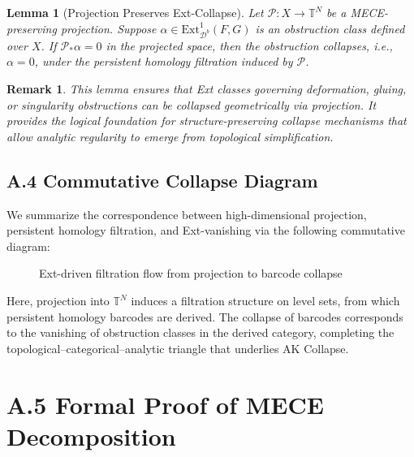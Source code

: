 \documentclass[11pt]{article}
\newtheorem{remark}[theorem]{Remark}
\newtheorem{lemma}[theorem]{Lemma}
\begin{document}
\begin{lemma}[Projection Preserves Ext-Collapse]
Let $\mathcal{P} : X \to \mathbb{T}^N$ be a MECE-preserving projection.  
Suppose $\alpha \in \mathrm{Ext}^1_{\mathcal{D}^b}(F, G)$ is an obstruction class defined over $X$.  
If $\mathcal{P}_\ast \alpha = 0$ in the projected space, then the obstruction collapses, i.e., $\alpha = 0$, under the persistent homology filtration induced by $\mathcal{P}$.
\end{lemma}

\begin{remark}
This lemma ensures that Ext classes governing deformation, gluing, or singularity obstructions can be collapsed geometrically via projection.  
It provides the logical foundation for structure-preserving collapse mechanisms that allow analytic regularity to emerge from topological simplification.
\end{remark}



\subsection*{A.4 Commutative Collapse Diagram}

We summarize the correspondence between high-dimensional projection, persistent homology filtration, and Ext-vanishing via the following commutative diagram:

\begin{figure}[htbp]
\centering
{}
\caption{Ext-driven filtration flow from projection to barcode collapse}
\end{figure}


Here, projection into $\mathbb{T}^N$ induces a filtration structure on level sets, from which persistent homology barcodes are derived.  
The collapse of barcodes corresponds to the vanishing of obstruction classes in the derived category, completing the topological–categorical–analytic triangle that underlies AK Collapse.



\section*{A.5 Formal Proof of MECE Decomposition}
\end{document}
